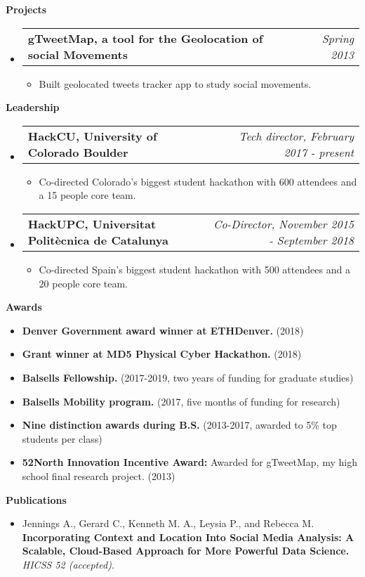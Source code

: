 \documentclass[letterpaper,10pt]{article}
\makeatletter
\newcommand{\resitem}[1]{\item #1 \vspace{-2pt}}
\newcommand{\resheading}[1]{{\large \colorbox{mygrey}{\begin{minipage}{\textwidth}{\textbf{#1 \vphantom{p\^{E}}}}\end{minipage}}}}
\newcommand{\ressubheading}[4]{
\begin{tabular*}{7.0in}{l@{\extracolsep{\fill}}r}
		\textbf{#1} & \textit{#4} \\
\end{tabular*}\vspace{-6pt}}
\makeatother
\begin{document}
\resheading{Projects}
	\begin{itemize}
		\item
			\ressubheading{gTweetMap, a tool for the Geolocation of social Movements}{Barcelona, Spain}{Student}{Spring 2013}
			\begin{itemize}
				\resitem{Built geolocated tweets tracker app to study social movements.}
			\end{itemize}
	\end{itemize}

\resheading{Leadership}
	\begin{itemize}
		\item 
			\ressubheading{HackCU, University of Colorado Boulder}{Boulder, CO}{Tech director}{Tech director, February 2017 - present}
			\begin{itemize}
				\resitem{Co-directed Colorado's biggest student hackathon with 600 attendees and a 15 people core team.}
			\end{itemize}
		\item
			\ressubheading{HackUPC, Universitat Polit\`ecnica de Catalunya}{Barcelona, Spain}{Co-Director and organizer}{Co-Director, November 2015 - September 2018}
			\begin{itemize}
				\resitem{Co-directed Spain's biggest student hackathon with 500 attendees and a 20 people core team.}
			\end{itemize}
	\end{itemize}

\resheading{Awards}
	\begin{itemize}
		\resitem{\textbf{Denver Government award winner at ETHDenver.} (2018)}
		\resitem{\textbf{Grant winner at MD5 Physical Cyber Hackathon.} (2018)}
		\resitem{\textbf{Balsells Fellowship.} (2017-2019, two years of funding for graduate studies)}
		\resitem{\textbf{Balsells Mobility program.} (2017, five months of funding for research)}
		\resitem{\textbf{Nine distinction awards during B.S.} (2013-2017, awarded to 5\% top students per class)}
		\resitem{\textbf{52North Innovation Incentive Award:} Awarded for gTweetMap, my high school final research project. (2013)}
	\end{itemize}

\resheading{Publications}
	\begin{itemize}
		\item 	Jennings A., Gerard C., Kenneth M. A., Leysia P., and Rebecca M.  \textbf{Incorporating Context and Location Into Social Media Analysis: A Scalable, Cloud-Based Approach for More Powerful Data Science.}  \textit{HICSS 52 (accepted).} 
	\end{itemize}
\end{document}
